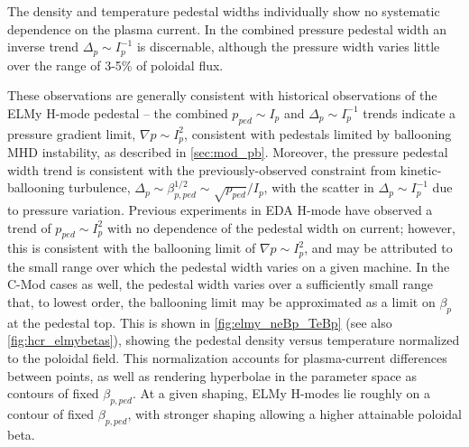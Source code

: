 The density and temperature pedestal widths individually show no systematic dependence on the plasma current.  In the combined pressure pedestal width an inverse trend $\Delta_p \sim I_p^{-1}$ is discernable, although the pressure width varies little over the range of 3-5\% of poloidal flux.

These observations are generally consistent with historical observations of the ELMy H-mode pedestal -- the combined $p_{ped} \sim I_p$ and $\Delta_p \sim I_p^{-1}$ trends indicate a pressure gradient limit, $\nabla p \sim I_p^2$, consistent with pedestals limited by ballooning MHD instability, as described in \cref{sec:mod_pb}.  Moreover, the pressure pedestal width trend is consistent with the previously-observed constraint from kinetic-ballooning turbulence, $\Delta_p \sim \beta_{p,ped}^{1/2} \sim \sqrt{p_{ped}}/I_p$, with the scatter in $\Delta_p \sim I_p^{-1}$ due to pressure variation.  Previous experiments in EDA H-mode \cite{Hughes2002} have observed a trend of $p_{ped} \sim I_p^2$ with no dependence of the pedestal width on current; however, this is consistent with the ballooning limit of $\nabla p \sim I_p^2$, and may be attributed to the small range over which the pedestal width varies on a given machine.  In the C-Mod cases as well, the pedestal width varies over a sufficiently small range that, to lowest order, the ballooning limit may be approximated as a limit on $\beta_{p}$ at the pedestal top.  This is shown in \cref{fig:elmy_neBp_TeBp} (see also \cref{fig:hcr_elmybetas}), showing the pedestal density versus temperature normalized to the poloidal field.  This normalization accounts for plasma-current differences between points, as well as rendering hyperbolae in the parameter space as contours of fixed $\beta_{p,ped}$.  At a given shaping, ELMy H-modes lie roughly on a contour of fixed $\beta_{p,ped}$, with stronger shaping allowing a higher attainable poloidal beta.

